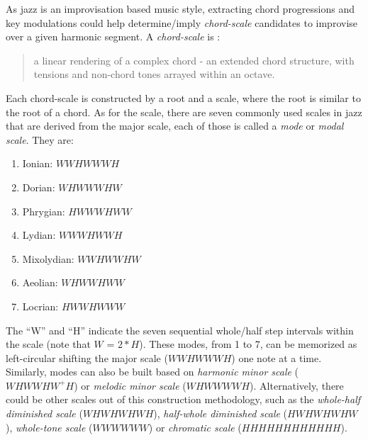 As jazz is an improvisation based music style, extracting chord progressions and key modulations could help determine/imply {\it chord-scale} candidates to improvise over a given harmonic segment. A {\it chord-scale} is \cite{hojnackijazz}:
\begin{quote}
a linear rendering of a complex chord - an extended chord structure, with tensions and non-chord tones arrayed within an octave.
\end{quote}
Each chord-scale is constructed by a root and a scale, where the root is similar to the root of a chord. As for the scale, there are seven commonly used scales in jazz that are derived from the major scale, each of those is called a {\it mode} or {\it modal scale}. They are:
\begin{enumerate}
\item Ionian: $WWHWWWH$
\item Dorian: $WHWWWHW$
\item Phrygian: $HWWWHWW$
\item Lydian: $WWWHWWH$
\item Mixolydian: $WWHWWHW$
\item Aeolian: $WHWWHWW$
\item Locrian: $HWWHWWW$
\end{enumerate}
The ``W'' and ``H'' indicate the seven sequential whole/half step intervals within the scale (note that $W$ = $2*H$). These modes, from 1 to 7, can be memorized as left-circular shifting the major scale ($WWHWWWH$) one note at a time. Similarly, modes can also be built based on {\it harmonic minor scale} ($WHWWHW^+H$) or {\it melodic minor scale} ($WHWWWWH$). Alternatively, there could be other scales out of this construction methodology, such as the {\it whole-half diminished scale} ($WHWHWHWH$), {\it half-whole diminished scale} ($HWHWHWHW$), {\it whole-tone scale} ($WWWWWW$) or {\it chromatic scale} ($HHHHHHHHHHHH$).

